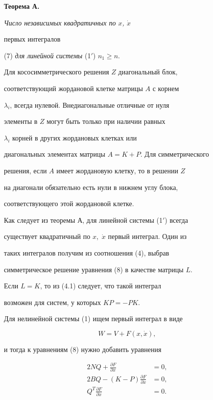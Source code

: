 {\bf Теорема А.} {\it Число независимых квадратичных по $x$, $\Dot{x}$


первых интегралов} (7) {\it для линейной системы} (1$'$) $n_{1} \ge n$.


\medskip





Для кососимметрического решения $Z$ диагональный блок,


соответствующий жордановой клетке матрицы $A$ с корнем


$\lambda_{i} $, всегда нулевой. Внедиагональные отличные от нуля


элементы в $Z$ могут быть только при наличии равных


$\lambda_{i} $ корней в других жордановых клетках или


диагональных элементах матрицы $A=K+P$. Для симметрического


решения, если $A$ имеет жордановую клетку, то в решении $Z$


на диагонали обязательно есть нули в нижнем углу блока,


соответствующего этой жордановой клетке.





Как следует из теоремы А, для линейной системы (1$'$) всегда


существует квадратичный по $x$,~$\Dot{x}$ первый интеграл. Один из


таких интегралов получим из соотношения (4), выбрав


симметрическое решение уравнения (8) в качестве матрицы $L$.


Если $L=K$, то из (4.1) следует, что такой интеграл


возможен для систем, у которых $KP=-PK$.





Для нелинейной системы (1) ищем первый интеграл в виде


\begin{equation}


W=V+F(x,\Dot{x}), \tag{9}


\end{equation}


и тогда к уравнениям (8) нужно добавить уравнения


\begin{align}


2NQ+\frac{\partial F }{\partial x}&=0, \tag{10}\\


%


2BQ-(K-P)\frac{\partial F }{\partial \Dot{x}}&=0, \tag{11}\\


%


Q^{T}\frac{\partial F }{\partial \Dot{x}}&=0. \tag{12}


\end{align}


